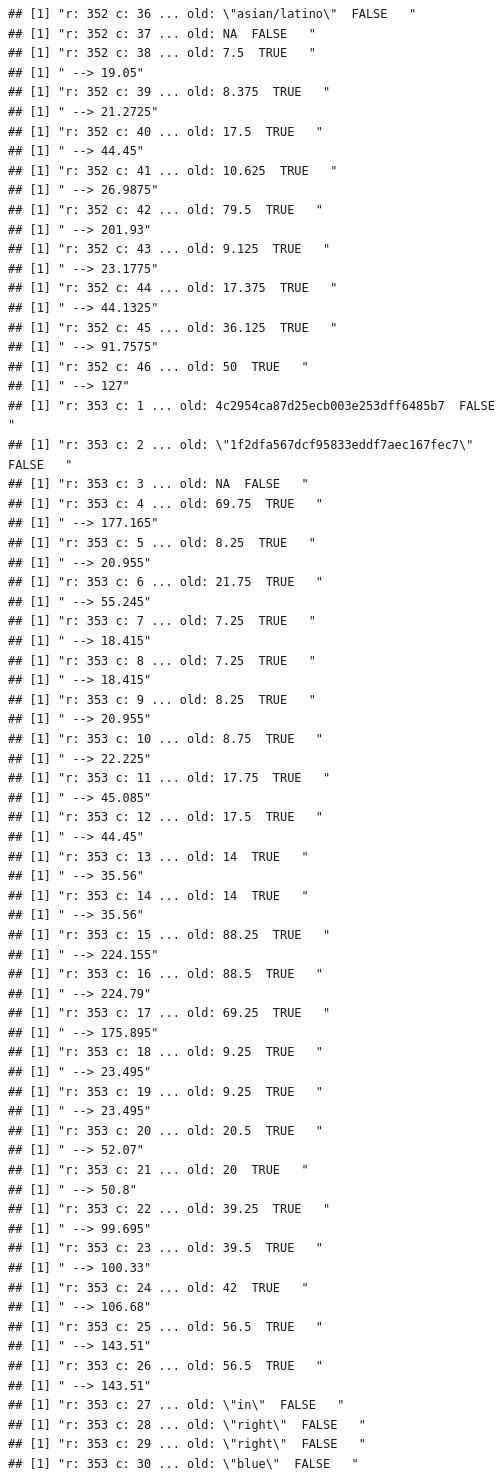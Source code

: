 \documentclass[]{article}
\begin{document}
\begin{verbatim}
## [1] "r: 352 c: 36 ... old: \"asian/latino\"  FALSE   "
## [1] "r: 352 c: 37 ... old: NA  FALSE   "
## [1] "r: 352 c: 38 ... old: 7.5  TRUE   "
## [1] " --> 19.05"
## [1] "r: 352 c: 39 ... old: 8.375  TRUE   "
## [1] " --> 21.2725"
## [1] "r: 352 c: 40 ... old: 17.5  TRUE   "
## [1] " --> 44.45"
## [1] "r: 352 c: 41 ... old: 10.625  TRUE   "
## [1] " --> 26.9875"
## [1] "r: 352 c: 42 ... old: 79.5  TRUE   "
## [1] " --> 201.93"
## [1] "r: 352 c: 43 ... old: 9.125  TRUE   "
## [1] " --> 23.1775"
## [1] "r: 352 c: 44 ... old: 17.375  TRUE   "
## [1] " --> 44.1325"
## [1] "r: 352 c: 45 ... old: 36.125  TRUE   "
## [1] " --> 91.7575"
## [1] "r: 352 c: 46 ... old: 50  TRUE   "
## [1] " --> 127"
## [1] "r: 353 c: 1 ... old: 4c2954ca87d25ecb003e253dff6485b7  FALSE   "
## [1] "r: 353 c: 2 ... old: \"1f2dfa567dcf95833eddf7aec167fec7\"  FALSE   "
## [1] "r: 353 c: 3 ... old: NA  FALSE   "
## [1] "r: 353 c: 4 ... old: 69.75  TRUE   "
## [1] " --> 177.165"
## [1] "r: 353 c: 5 ... old: 8.25  TRUE   "
## [1] " --> 20.955"
## [1] "r: 353 c: 6 ... old: 21.75  TRUE   "
## [1] " --> 55.245"
## [1] "r: 353 c: 7 ... old: 7.25  TRUE   "
## [1] " --> 18.415"
## [1] "r: 353 c: 8 ... old: 7.25  TRUE   "
## [1] " --> 18.415"
## [1] "r: 353 c: 9 ... old: 8.25  TRUE   "
## [1] " --> 20.955"
## [1] "r: 353 c: 10 ... old: 8.75  TRUE   "
## [1] " --> 22.225"
## [1] "r: 353 c: 11 ... old: 17.75  TRUE   "
## [1] " --> 45.085"
## [1] "r: 353 c: 12 ... old: 17.5  TRUE   "
## [1] " --> 44.45"
## [1] "r: 353 c: 13 ... old: 14  TRUE   "
## [1] " --> 35.56"
## [1] "r: 353 c: 14 ... old: 14  TRUE   "
## [1] " --> 35.56"
## [1] "r: 353 c: 15 ... old: 88.25  TRUE   "
## [1] " --> 224.155"
## [1] "r: 353 c: 16 ... old: 88.5  TRUE   "
## [1] " --> 224.79"
## [1] "r: 353 c: 17 ... old: 69.25  TRUE   "
## [1] " --> 175.895"
## [1] "r: 353 c: 18 ... old: 9.25  TRUE   "
## [1] " --> 23.495"
## [1] "r: 353 c: 19 ... old: 9.25  TRUE   "
## [1] " --> 23.495"
## [1] "r: 353 c: 20 ... old: 20.5  TRUE   "
## [1] " --> 52.07"
## [1] "r: 353 c: 21 ... old: 20  TRUE   "
## [1] " --> 50.8"
## [1] "r: 353 c: 22 ... old: 39.25  TRUE   "
## [1] " --> 99.695"
## [1] "r: 353 c: 23 ... old: 39.5  TRUE   "
## [1] " --> 100.33"
## [1] "r: 353 c: 24 ... old: 42  TRUE   "
## [1] " --> 106.68"
## [1] "r: 353 c: 25 ... old: 56.5  TRUE   "
## [1] " --> 143.51"
## [1] "r: 353 c: 26 ... old: 56.5  TRUE   "
## [1] " --> 143.51"
## [1] "r: 353 c: 27 ... old: \"in\"  FALSE   "
## [1] "r: 353 c: 28 ... old: \"right\"  FALSE   "
## [1] "r: 353 c: 29 ... old: \"right\"  FALSE   "
## [1] "r: 353 c: 30 ... old: \"blue\"  FALSE   "

\end{verbatim}
\end{document}
